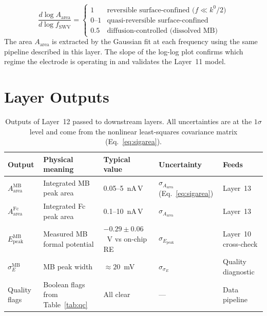 \documentclass[10pt,a4paper]{article}
\numberwithin{equation}{section}
\newcommand{\Aarea}{A_{\text{area}}}
\newcommand{\Epk}{E_{\text{peak}}}
\begin{document}
\begin{equation}
  \frac{d\log\Aarea}{d\log f_\text{SWV}} =
  \begin{cases}
    1 & \text{reversible surface-confined (}f \ll k^0/2\text{)}\\
    0\text{--}1 & \text{quasi-reversible surface-confined}\\
    0.5 & \text{diffusion-controlled (dissolved MB)}
  \end{cases}
  \label{eq:freqslope}
\end{equation}
The area $\Aarea$ is extracted by the Gaussian fit at each frequency using
the same pipeline described in this layer. The slope of the log-log plot
confirms which regime the electrode is operating in and validates the
Layer~11 model.

\section{Layer Outputs}
\label{sec:outputs}

\begin{table}[H]
\centering
\small\renewcommand{\arraystretch}{1.3}
\begin{tabularx}{\linewidth}{@{}lXlll@{}}
\toprule
Output & Physical meaning & Typical value & Uncertainty & Feeds \\
\midrule
$\Aarea^\text{MB}$ & Integrated MB peak area & 0.05--5~nA\,V & $\sigma_{\Aarea}$ (Eq.~\ref{eq:sigarea}) & Layer~13 \\
$\Aarea^\text{Fc}$ & Integrated Fc peak area & 0.1--10~nA\,V & $\sigma_{\Aarea}$ & Layer~13 \\
$\Epk^\text{MB}$ & Measured MB formal potential & $-0.29 \pm 0.06$~V vs on-chip RE & $\sigma_{\Epk}$ & Layer~10 cross-check \\
$\sigma_E^\text{MB}$ & MB peak width & $\approx 20$~mV & $\sigma_{\sigma_E}$ & Quality diagnostic \\
Quality flags & Boolean flags from Table~\ref{tab:qc} & All clear & --- & Data pipeline \\
\bottomrule
\end{tabularx}
\caption{Outputs of Layer~12 passed to downstream layers. All uncertainties
are at the $1\sigma$ level and come from the nonlinear least-squares
covariance matrix (Eq.~\ref{eq:sigarea}).}
\label{tab:outputs}
\end{table}

\end{document}
